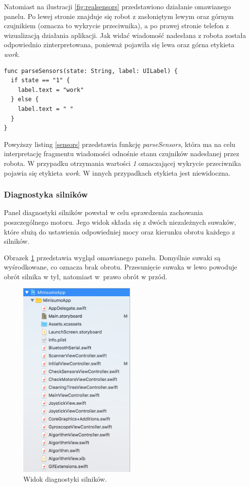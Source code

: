 Natomiast na ilustracji \ref{fig:realsensors} przedstawiono działanie omawianego panelu. Po lewej stronie znajduje się robot z zasłoniętym lewym oraz górnym czujnikiem (oznacza to wykrycie przeciwnika), a po prawej stronie telefon z wizualizacją działania aplikacji. Jak widać wiadomość nadesłana z robota została odpowiednio zinterpretowana, ponieważ pojawiła się lewa oraz górna etykieta \textit{work}.

\begin{minipage}{\textwidth}
	\begin{lstlisting}[label=sensors,caption=Parsowanie wiadomości zawierającej stan czujników.]
func parseSensors(state: String, label: UILabel) {
  if state == "1" {
    label.text = "work"
  } else {
    label.text = " "
  }
}
	\end{lstlisting}
\end{minipage}

Powyższy listing \ref{sensors} przedstawia funkcję \textit{parseSensors}, która ma na celu interpretację fragmentu wiadomości odnośnie stanu czujników nadesłanej przez robota. W przypadku otrzymania wartości \textit{1} oznaczającej wykrycie przeciwnika pojawia się etykieta \textit{work}. W innych przypadkach etykieta jest niewidoczna.
 
\subsubsection{Diagnostyka silników}
Panel diagnostyki silników powstał w celu sprawdzenia zachowania poszczególnego motoru. Jego widok składa się z dwóch niezależnych suwaków, które służą do ustawienia odpowiedniej mocy oraz kierunku obrotu każdego z silników.

Obrazek \ref{fig:motors} przedstawia wygląd omawianego panelu. Domyślnie suwaki są wyśrodkowane, co oznacza brak obrotu. Przesunięcie suwaka w lewo powoduje obrót silnika w tył, natomiast w~prawo obrót w przód.

\begin{figure}[H]
	\centering
		\includegraphics[width=0.75\linewidth, height=10cm, keepaspectratio]{pic05/structure.png}
	\caption{Widok diagnostyki silników.}
	\label{fig:motors}	
\end{figure}


